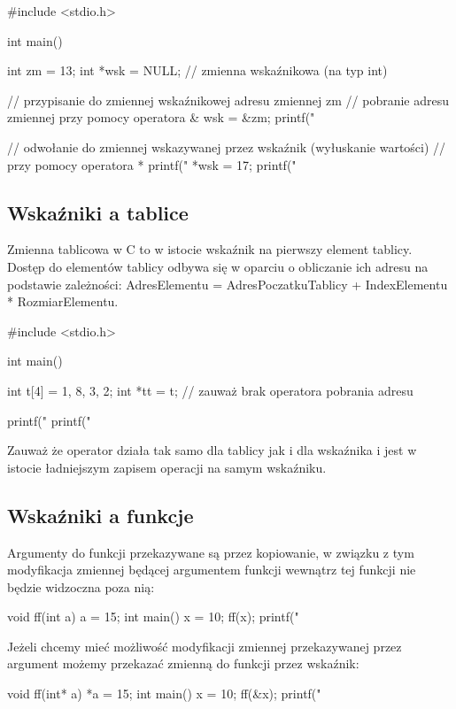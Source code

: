 \begin{CodeFrame*}[c]{}
#include <stdio.h>

int main() {
    int zm = 13;
    int *wsk = NULL; // zmienna wskaźnikowa (na typ int)
    
    // przypisanie do zmiennej wskaźnikowej adresu zmiennej zm
    // pobranie adresu zmiennej przy pomocy operatora &
    wsk = &zm;
    printf("%
    
    // odwołanie do zmiennej wskazywanej przez wskaźnik (wyłuskanie wartości)
    // przy pomocy operatora *
    printf("%
    *wsk = 17;
    printf("%
}
\end{CodeFrame*}

\subsection{Wskaźniki a tablice}

Zmienna tablicowa w C to w istocie wskaźnik na pierwszy element tablicy.
Dostęp do elementów tablicy odbywa się w oparciu o obliczanie ich adresu na podstawie zależności: AdresElementu = AdresPoczatkuTablicy + IndexElementu * RozmiarElementu.

\begin{CodeFrame*}[c]{}
#include <stdio.h>

int main() {
  int t[4] = {1, 8, 3, 2};
  int *tt = t; // zauważ brak operatora pobrania adresu
  
  printf("%
  printf("%
}
\end{CodeFrame*}

Zauważ że operator  działa tak samo dla tablicy jak i dla wskaźnika i jest w istocie ładniejszym zapisem operacji  na samym wskaźniku.

\subsection{Wskaźniki a funkcje}
Argumenty do funkcji przekazywane są przez kopiowanie, w związku z tym modyfikacja zmiennej będącej argumentem funkcji wewnątrz tej funkcji nie będzie widzoczna poza nią:
\begin{CodeFrame*}[c]{}
void ff(int a) {
    a = 15;
}
int main() {
    x = 10;
    ff(x);
    printf("%
}
\end{CodeFrame*}

Jeżeli chcemy mieć możliwość modyfikacji zmiennej przekazywanej przez argument możemy przekazać zmienną do funkcji przez wskaźnik:
\begin{CodeFrame*}[c]{}
void ff(int* a) {
    *a = 15;
}
int main() {
    x = 10;
    ff(&x);
    printf("%
}
\end{CodeFrame*}

